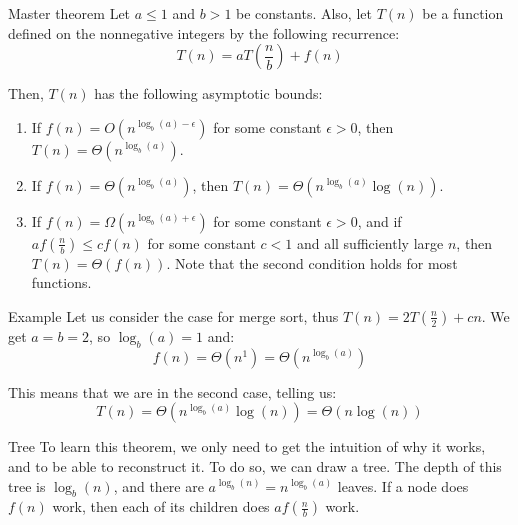 \documentclass[a4paper]{article}
\begin{document}
\begin{parag}{Master theorem}
    Let $a \leq 1$ and $b > 1$ be constants. Also, let $T\left(n\right)$ be a function defined on the nonnegative integers by the following recurrence: 
    \[T\left(n\right) = aT\left(\frac{n}{b}\right) + f\left(n\right)\]
    
    Then, $T\left(n\right)$ has the following asymptotic bounds:
    \begin{enumerate}
        \item If $f\left(n\right) = O\left(n^{\log_b\left(a\right) - \epsilon}\right)$ for some constant $\epsilon > 0$, then $T\left(n\right) = \Theta\left(n^{\log_b\left(a\right)}\right)$.
        \item If $f\left(n\right) = \Theta\left(n^{\log_b\left(a\right)}\right)$, then $T\left(n\right) = \Theta\left(n^{\log_b\left(a\right)} \log\left(n\right)\right)$.
        \item If $f\left(n\right) = \Omega\left(n^{\log_b\left(a\right) + \epsilon}\right)$ for some constant $\epsilon > 0$, and if $a f\left(\frac{n}{b}\right) \leq c f\left(n\right)$ for some constant $c < 1$ and all sufficiently large $n$, then $T\left(n\right)= \Theta\left(f\left(n\right)\right)$. Note that the second condition holds for most functions.
    \end{enumerate}

    \begin{subparag}{Example}
        Let us consider the case for merge sort, thus $T\left(n\right) = 2T\left(\frac{n}{2}\right) + cn$. We get $a = b = 2$, so $\log_b\left(a\right) = 1$ and: 
        \[f\left(n\right) = \Theta\left(n^1\right) = \Theta\left(n^{\log_b\left(a\right)}\right)\]
        
        This means that we are in the second case, telling us: 
        \[T\left(n\right) = \Theta\left(n^{\log_b\left(a\right)} \log\left(n\right)\right) = \Theta\left(n \log\left(n\right)\right)\]
    \end{subparag}
    
    \begin{subparag}{Tree}
        To learn this theorem, we only need to get the intuition of why it works, and to be able to reconstruct it. To do so, we can draw a tree. The depth of this tree is $\log_b\left(n\right)$, and there are $a^{\log_b\left(n\right)} = n^{\log_b\left(a\right)}$ leaves. If a node does $f\left(n\right)$ work, then each of its children does $af\left(\frac{n}{b}\right)$ work.


\end{subparag}
\end{parag}
\end{document}
